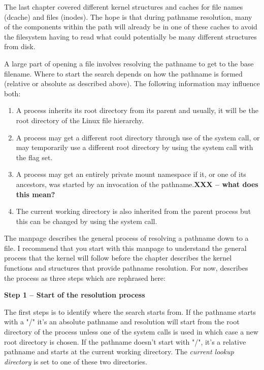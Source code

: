 The last chapter covered different kernel structures and caches for file names (dcache) and files (inodes). The hope is that during pathname resolution, many of the components within the path will already be in one of these caches to avoid the filesystem having to read what could potentially be many different structures from disk.

A large part of opening a file involves resolving the pathname to get to the base filename. Where to start the search depends on how the pathname is formed (relative or absolute as described above). The following information may influence both:

\begin{enumerate}
	\item A process inherits its root directory from its parent and usually, it will be the root directory of the Linux file hierarchy.
	\item A process may get a different root directory through use of the  system call, or may temporarily use a 
	different  root  directory by using the  system call with the  flag set.
	\item A process may get an entirely private mount namespace if it, or one of  its  ancestors, was  started 
	by an invocation  of  the pathname.\textbf{XXX -- what does this mean?}
	\item The current working directory is also inherited from the parent process but this can be changed by using the  
	system call.
\end{enumerate}

\noindent
The  manpage describes the general process of resolving a pathname down to a file. I recommend that you start with this manpage to understand the general process that the kernel will follow before the chapter describes the kernel functions and structures that provide pathname resolution. For now,  describes the process as three steps which are rephrased here:

\vspace{0.25cm}
\noindent
\textbf{Step 1 -- Start of the resolution process}

\vspace{0.25cm}
\noindent
The first steps is to identify where the search starts from. If the pathname starts with a "/" it's an absolute pathname and resolution will start from the root directory of the process unless one of the  system calls is used in which case a new root directory is chosen. If the pathname doesn't start with "/", it's a relative pathname and starts at the current working directory. The \textit{current lookup directory} is set to one of these two directories.

